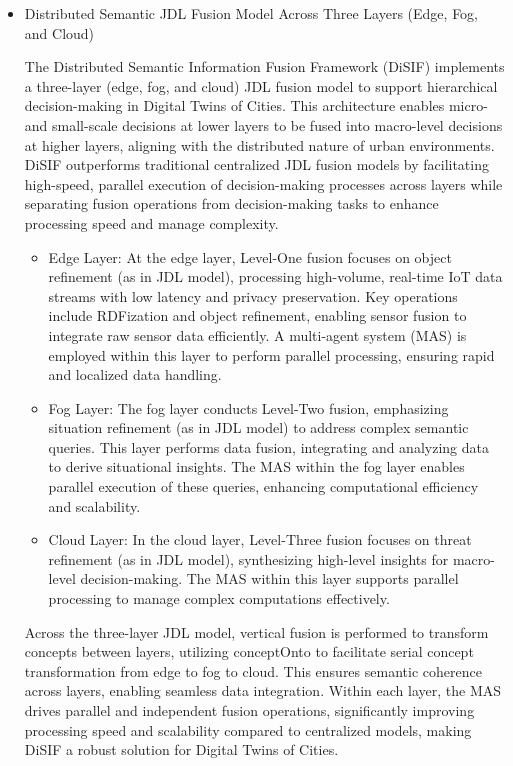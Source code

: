 \documentclass[5p,times]{elsarticle}
\begin{document}
 \begin{itemize}
  \item Distributed Semantic JDL Fusion Model Across Three Layers (Edge, Fog, and Cloud)
  
  The Distributed Semantic Information Fusion Framework (DiSIF) implements
   a three-layer (edge, fog, and cloud) JDL fusion model to support hierarchical
    decision-making in Digital Twins of Cities. This architecture enables
     micro- and small-scale decisions at lower layers to be fused into macro-level 
     decisions at higher layers, aligning with the distributed nature of urban
      environments. DiSIF outperforms traditional centralized JDL fusion models
       by facilitating high-speed, parallel execution of decision-making processes
        across layers while separating fusion operations from decision-making tasks
         to enhance processing speed and manage complexity.
  \begin{itemize}
    \item Edge Layer: At the edge layer, Level-One fusion focuses
     on object refinement (as in JDL model), processing high-volume, real-time IoT data
      streams with low latency and privacy preservation.
       Key operations include RDFization and object refinement,
        enabling sensor fusion to integrate raw sensor
         data efficiently.
          A multi-agent system (MAS) is
          employed within this layer to perform parallel processing,
           ensuring rapid and localized data handling.
    \item Fog Layer: The fog layer conducts Level-Two fusion,
     emphasizing situation refinement (as in JDL model) to address complex semantic 
     queries. This layer performs data fusion, integrating
      and analyzing data to derive situational insights. The MAS within the 
      fog layer enables parallel execution of these queries,
       enhancing computational efficiency and scalability.
    \item Cloud Layer: In the cloud layer, 
    Level-Three fusion focuses on threat refinement (as in JDL model),
     synthesizing high-level insights for macro-level decision-making.
      The MAS within this layer supports parallel processing to
       manage complex computations effectively.
  \end{itemize}

  Across the three-layer JDL model, vertical fusion is performed 
  to transform concepts between layers, utilizing conceptOnto 
  to facilitate serial concept transformation from edge to fog to cloud.
   This ensures semantic coherence across layers,
    enabling seamless data integration. Within each layer, 
    the MAS drives parallel and independent fusion operations,
     significantly improving processing speed and scalability
      compared to centralized models, making DiSIF a robust solution
       for Digital Twins of Cities.



\end{itemize}
\end{document}
